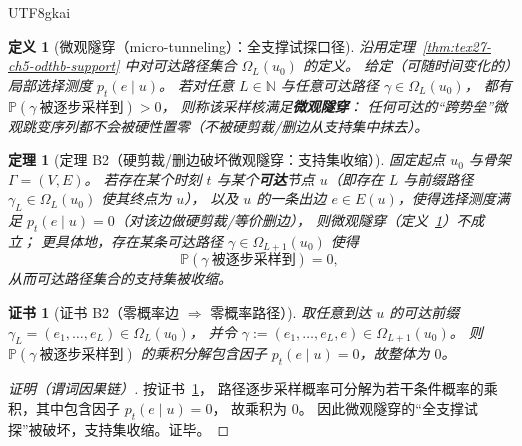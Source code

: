 \documentclass[12pt]{article}
\newtheorem{definition}{定义}[section]
\newtheorem{theorem}{定理}[section]
\newtheorem{Certificate}{证书}[section]
\newcommand{\NN}{\mathbb{N}}
\begin{document}
\begin{CJK*}{UTF8}{gkai}
\begin{definition}[微观隧穿（micro-tunneling）：全支撑试探口径]
\label{def:tex27-ch5-odthb-microtunneling}
沿用定理~\ref{thm:tex27-ch5-odthb-support} 中对可达路径集合 $\Omega_L(u_0)$ 的定义。
给定（可随时间变化的）局部选择测度 $p_t(e\mid u)$。
若对任意 $L\in\NN$ 与任意可达路径 $\gamma\in\Omega_L(u_0)$，
都有 $\mathbb{P}(\gamma\ \text{被逐步采样到})>0$，
则称该采样核满足\textbf{微观隧穿}：
任何可达的“跨势垒”微观跳变序列都不会被硬性置零（不被硬剪裁/删边从支持集中抹去）。
\end{definition}

\begin{theorem}[定理 B2（硬剪裁/删边破坏微观隧穿：支持集收缩）]
\label{thm:tex27-ch5-odthb-microtunnel-no-hardprune}
固定起点 $u_0$ 与骨架 $\Gamma=(V,E)$。
若存在某个时刻 $t$ 与某个\textbf{可达}节点 $u$（即存在 $L$ 与前缀路径 $\gamma_L\in\Omega_L(u_0)$ 使其终点为 $u$），
以及 $u$ 的一条出边 $e\in E(u)$，使得选择测度满足 $p_t(e\mid u)=0$（对该边做硬剪裁/等价删边），
则微观隧穿（定义~\ref{def:tex27-ch5-odthb-microtunneling}）不成立；
更具体地，存在某条可达路径 $\gamma\in\Omega_{L+1}(u_0)$ 使得
\[
  \mathbb{P}(\gamma\ \text{被逐步采样到})=0,
\]
从而可达路径集合的支持集被收缩。
\end{theorem}

\begin{Certificate}[证书 B2（零概率边 $\Rightarrow$ 零概率路径）]
\label{cert:tex27-ch5-odthb-microtunnel-no-hardprune}
取任意到达 $u$ 的可达前缀 $\gamma_L=(e_1,\dots,e_L)\in\Omega_L(u_0)$，
并令 $\gamma:=(e_1,\dots,e_L,e)\in\Omega_{L+1}(u_0)$。
则 $\mathbb{P}(\gamma\ \text{被逐步采样到})$ 的乘积分解包含因子 $p_t(e\mid u)=0$，故整体为 $0$。
\end{Certificate}

\begin{proof}[证明（谓词因果链）]
按证书~\ref{cert:tex27-ch5-odthb-microtunnel-no-hardprune}，
路径逐步采样概率可分解为若干条件概率的乘积，其中包含因子 $p_t(e\mid u)=0$，
故乘积为 $0$。
因此微观隧穿的“全支撑试探”被破坏，支持集收缩。证毕。
\end{proof}


\end{CJK*}
\end{document}
